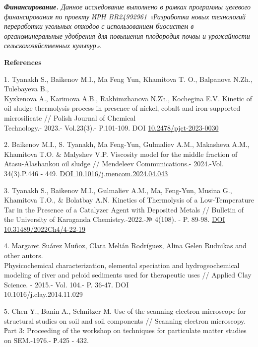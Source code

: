 \begin{multicols}{2}
\emph{{\bfseries Финансирование.} Данное исследование выполнено в рамках
программы целевого финансирования по проекту ИРН BR24992961 «Разработка
новых технологий переработки угольных отходов с использованием биосистем
в органоминеральные удобрения для повышения плодородия почвы и
урожайности сельскохозяйственных культур».}
\end{multicols}

\begin{center}
{\bfseries References}
\end{center}

\begin{references}
1. Tyanakh S., Baikenov M.I., Ma Feng Yun, Khamitova T. O., Balpanova
N.Zh., Tulebayeva B., \\Kyzkenova A., Karimova A.B., Rakhimzhanova N.Zh.,
Kochegina E.V\emph{.} Kinetic of oil sludge thermolysis process in
presence of nickel, cobalt and iron-supported microsilicate // Polish
Journal of Chemical \\Technology.- 2023.- Vol.23(3).- P.101-109. DOI
\href{https://doi.org/10.2478/pjct-2023-0030}{10.2478/pjct-2023-0030}

2. Baikenov M.I., S. Tyanakh, Ma Feng-Yun, Gulmaliev A.M., Makasheva
A.M., Khamitova T.O. \& Malyshev V.P. Viscosity model for the middle
fraction of Atasu-Alashankou oil sludge // Mendeleev Communications.-
2024.-Vol. 34(3).P.446 - 449.
\href{https://doi.org/10.1016/j.mencom.2024.04.043}{DOI
10.1016/j.mencom.2024.04.043}

3. Tyanakh S., Baikenov M.I., Gulmaliev A.M., Ma, Feng-Yun, Musina G.,
Khamitova T.O., \& Bolatbay A.N\emph{.} Kinetics of Thermolysis of a
Low-Temperature Tar in the Presence of a Catalyzer Agent with Deposited
Metals // Bulletin of the University of Karaganda Chemistry.-2022.-№
4(108). - P. 89-98. \href{https://doi.org/10.31489/2022Ch4/4-22-19}{DOI
10.31489/2022Ch4/4-22-19}

4. Margaret Suárez Muñoz, Clara Melián Rodríguez, Alina Gelen Rudnikas
and other autors. \\Physicochemical characterization, elemental speciation
and hydrogeochemical modeling of river and peloid sediments used for
therapeutic uses // Applied Clay Science. - 2015.- Vol. 104.- P. 36-47.
DOI \\10.1016/j.clay.2014.11.029

5. Chen Y., Banin A., Schnitzer M. Use of the scanning electron
microscope for structural studies on soil and soil components //
Scanning electron microscopy. Рart 3: Proceeding of the workshop on
techniques for particulate matter studies on SEM.-1976.- Р.425 - 432.


\end{references}
